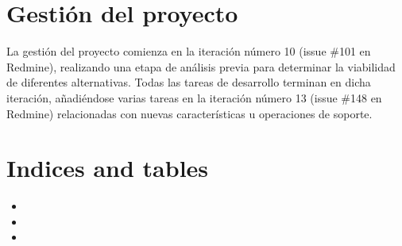 \documentclass[letterpaper,10pt,spanish]{sphinxmanual}
\begin{document}
\chapter{Gestión del proyecto}
\label{project_mgmt/intro:gestion-del-proyecto}\label{project_mgmt/intro::doc}
La gestión del proyecto comienza en la iteración número 10 (issue \#101 en Redmine), realizando una etapa de análisis previa para determinar la viabilidad de diferentes alternativas. Todas las tareas de desarrollo terminan en dicha iteración, añadiéndose varias tareas en la iteración número 13 (issue \#148 en Redmine) relacionadas con nuevas características u operaciones de soporte.


\chapter{Indices and tables}
\label{index:indices-and-tables}\begin{itemize}
\item {} 

\item {} 

\item {} 

\end{itemize}



\renewcommand{\indexname}{Índice}
\printindex
\end{document}
